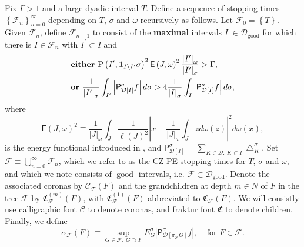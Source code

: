 \documentclass{amsart}%
\theoremstyle{plain}
\numberwithin{equation}{section}
\begin{document}
Fix $\Gamma>1$ and a large dyadic interval $T$. Define a sequence of stopping
times $\left\{  \mathcal{F}_{n}\right\}  _{n=0}^{\infty}$ depending on $T$,
$\sigma$ and $\omega$ recursively as follows. Let $\mathcal{F}_{0}=\left\{
T\right\}  $. Given $\mathcal{F}_{n}$, define $\mathcal{F}_{n+1}$ to consist
of the \textbf{maximal} intervals $I^{\prime}\in\mathcal{D}%
_{\operatorname{good}}$ for which there is $I\in\mathcal{F}_{n}$ with
$I^{\prime}\subset I$ and%
\begin{align}
& \text{\textbf{either} }\mathrm{P}\left(  I^{\prime},\mathbf{1}_{I\setminus
I^{\prime}}\sigma\right)  ^{2}\mathsf{E}\left(  J,\omega\right)  ^{2}%
\frac{\left\vert I^{\prime}\right\vert _{\omega}}{\left\vert I^{\prime
}\right\vert _{\sigma}}>\Gamma,\label{energy stop crit}\\
& \text{\textbf{or} }\frac{1}{\left\vert I^{\prime}\right\vert _{\sigma}}%
\int_{I^{\prime}}\left\vert \mathsf{P}_{\mathcal{D}\left[  I\right]  }%
^{\sigma}f\right\vert d\sigma>4\frac{1}{\left\vert I\right\vert _{\sigma}}%
\int_{I}\left\vert \mathsf{P}_{\mathcal{D}\left[  I\right]  }^{\sigma
}f\right\vert d\sigma,\nonumber
\end{align}
where
\[
\mathsf{E}\left(  J,\omega\right)  ^{2}\equiv\frac{1}{\left\vert J\right\vert
_{\omega}}\int_{J}\frac{1}{\ell\left(  J\right)  ^{2}}\left\vert x-\frac
{1}{\left\vert J\right\vert _{\omega}}\int_{J}zd\omega\left(  z\right)
\right\vert ^{2}d\omega\left(  x\right)  ,
\]
is the energy functional introduced in \cite{LaSaUr2}, and $\mathsf{P}%
_{\mathcal{D}\left[  I\right]  }^{\sigma}=\sum_{K\in\mathcal{D}:\ K\subset
I}\bigtriangleup_{K}^{\sigma}$. Set $\mathcal{F}\equiv\bigcup_{n=0}^{\infty
}\mathcal{F}_{n}$, which we refer to as the CZ-PE stopping times for $T$,
$\sigma$ and $\omega$, and which we note consists of $\operatorname{good}$
intervals, i.e. $\mathcal{F}\subset\mathcal{D}_{\operatorname{good}}$. Denote
the associated coronas by $\mathcal{C}_{\mathcal{F}}\left(  F\right)  $ and
the grandchildren at depth $m\in N$ of $F$ in the tree $\mathcal{F}$ by
$\mathfrak{C}_{\mathcal{F}}^{\left(  m\right)  }\left(  F\right)  $, with
$\mathfrak{C}_{\mathcal{F}}^{\left(  1\right)  }\left(  F\right)  $
abbreviated to $\mathfrak{C}_{\mathcal{F}}\left(  F\right)  $. We will
consistly use calligraphic font $\mathcal{C}$ to denote coronas, and fraktur
font $\mathfrak{C}$ to denote children. Finally, we define%
\[
\alpha_{\mathcal{F}}\left(  F\right)  \equiv\sup_{G\in\mathcal{F}:\ G\supset
F}E_{G}^{\sigma}\left\vert \mathsf{P}_{\mathcal{D}\left[  \pi_{\mathcal{F}%
}G\right]  }^{\sigma}f\right\vert ,\ \ \ \ \ \text{for }F\in\mathcal{F}.
\]
\end{document}
